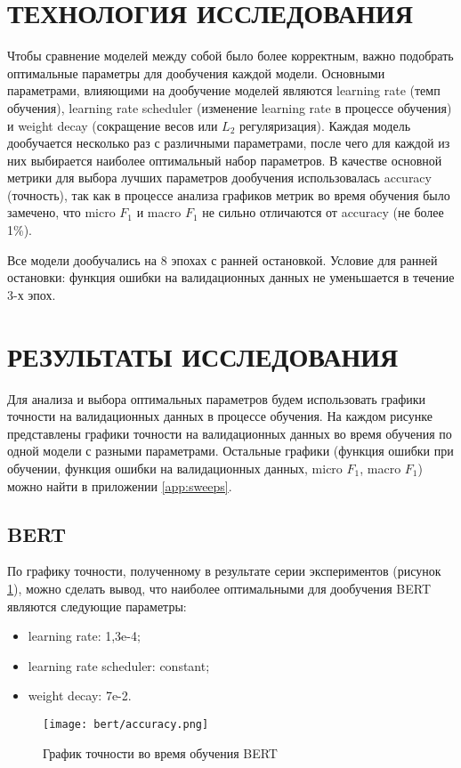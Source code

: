 \section{ТЕХНОЛОГИЯ ИССЛЕДОВАНИЯ}
Чтобы сравнение моделей между собой было более корректным, важно подобрать оптимальные параметры для дообучения каждой модели. Основными параметрами, влияющими на дообучение моделей являются learning rate (темп обучения), learning rate scheduler (изменение learning rate в процессе обучения) и weight decay (сокращение весов или $L_2$ регуляризация). Каждая модель дообучается несколько раз с различными параметрами, после чего для каждой из них выбирается наиболее оптимальный набор параметров. В качестве основной метрики для выбора лучших параметров дообучения использовалась accuracy (точность), так как в процессе анализа графиков метрик во время обучения было замечено, что micro $F_1$ и macro $F_1$ не сильно отличаются от accuracy (не более 1\%).

Все модели дообучались на 8 эпохах с ранней остановкой. Условие для ранней остановки: функция ошибки на валидационных данных не уменьшается в течение 3-х эпох.

\section{РЕЗУЛЬТАТЫ ИССЛЕДОВАНИЯ}
Для анализа и выбора оптимальных параметров будем использовать графики точности на валидационных данных в процессе обучения. На каждом рисунке 
представлены графики точности на валидационных данных во время обучения по одной модели с разными параметрами. Остальные графики (функция ошибки 
при обучении, функция ошибки на валидационных данных, micro $F_1$, macro $F_1$) можно найти в приложении \ref{app:sweeps}.
\subsection{BERT}
По графику точности, полученному в результате серии экспериментов (рисунок \ref{bert-accuracy:image}), можно сделать вывод, что наиболее 
оптимальными для дообучения BERT являются следующие параметры:
\begin{itemize}
    \item learning rate: 1,3e-4;
    \item learning rate scheduler: constant;
    \item weight decay: 7e-2.
\end{itemize}

\begin{figure}[H]
    \begin{center}
       \texttt{[image: bert/accuracy.png]}
       \caption{График точности во время обучения BERT}
       \label{bert-accuracy:image}
    \end{center}
\end{figure}
